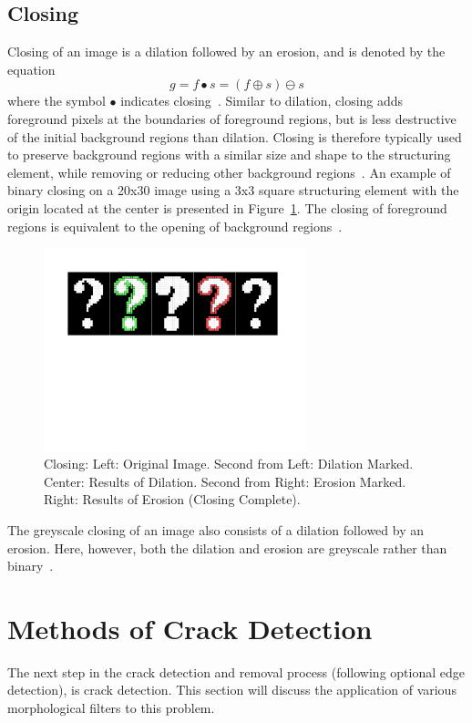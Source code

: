 \documentclass{sig-alternate}
\begin{document}
\subsection{Closing}\label{closing}
Closing of an image is a dilation followed by an erosion, and is denoted by the equation
\begin{equation*}
g = f \bullet s = (f \oplus s) \ominus s
\end{equation*}
where the symbol $\bullet$ indicates closing~\cite{MorphologyWikiAnonymous, MorphologyBook:2000}. Similar to dilation, closing adds foreground pixels at the boundaries of foreground regions, but is less destructive of the initial background regions than dilation. Closing is therefore typically used to preserve background regions with a similar size and shape to the structuring element, while removing or reducing other background regions~\cite{MorphologyWiki}. An example of binary closing on a 20x30 image using a 3x3 square structuring element with the origin located at the center is presented in Figure~\ref{binary closing figure}. The closing of foreground regions is equivalent to the opening of background regions~\cite{MorphologyWiki}.
\begin{figure}
\centering
\includegraphics[width=3in,trim={0 4.75in 0 0},clip]{closing}
\caption{Closing: Left: Original Image. Second from Left: Dilation Marked. Center: Results of Dilation. Second from Right: Erosion Marked. Right: Results of Erosion (Closing Complete).}
\label{binary closing figure}
\end{figure}

The greyscale closing of an image also consists of a dilation followed by an erosion. Here, however, both the dilation and erosion are greyscale rather than binary~\cite{MorphologyPaper:1987}.
\pagebreak

\section{Methods of Crack Detection}\label{crack detection}
The next step in the crack detection and removal process (following optional edge detection), is crack detection. This section will discuss the application of various morphological filters to this problem.
\end{document}

